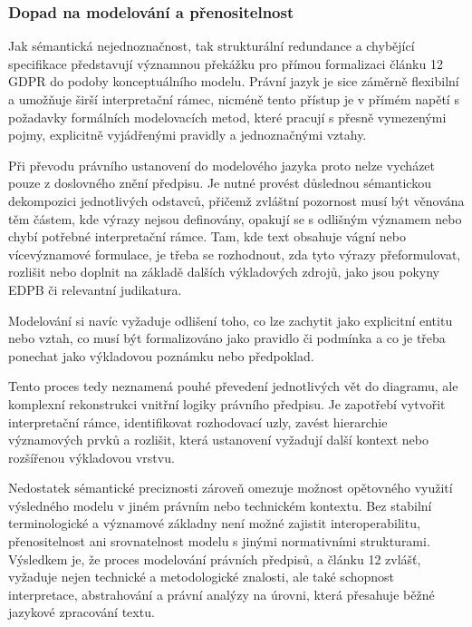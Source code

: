 
\subsubsection{Dopad na modelování a přenositelnost}
\label{sec:dopad-modelovani-prenositelnost}

Jak sémantická nejednoznačnost, tak strukturální redundance a chybějící specifikace představují významnou překážku pro přímou formalizaci článku 12 GDPR do podoby konceptuálního modelu. Právní jazyk je sice záměrně flexibilní a umožňuje širší interpretační rámec, nicméně tento přístup je v přímém napětí s požadavky formálních modelovacích metod, které pracují s přesně vymezenými pojmy, explicitně vyjádřenými pravidly a jednoznačnými vztahy.

Při převodu právního ustanovení do modelového jazyka proto nelze vycházet pouze z doslovného znění předpisu. Je nutné provést důslednou sémantickou dekompozici jednotlivých odstavců, přičemž zvláštní pozornost musí být věnována těm částem, kde výrazy nejsou definovány, opakují se s odlišným významem nebo chybí potřebné interpretační rámce. Tam, kde text obsahuje vágní nebo vícevýznamové formulace, je třeba se rozhodnout, zda tyto výrazy přeformulovat, rozlišit nebo doplnit na základě dalších výkladových zdrojů, jako jsou pokyny EDPB či relevantní judikatura.

Modelování si navíc vyžaduje odlišení toho, co lze zachytit jako explicitní entitu nebo vztah, co musí být formalizováno jako pravidlo či podmínka a co je třeba ponechat jako výkladovou poznámku nebo předpoklad. 

Tento proces tedy neznamená pouhé převedení jednotlivých vět do diagramu, ale komplexní rekonstrukci vnitřní logiky právního předpisu. Je zapotřebí vytvořit interpretační rámce, identifikovat rozhodovací uzly, zavést hierarchie významových prvků a rozlišit, která ustanovení vyžadují další kontext nebo rozšířenou výkladovou vrstvu.

Nedostatek sémantické preciznosti zároveň omezuje možnost opětovného využití výsledného modelu v jiném právním nebo technickém kontextu. Bez stabilní terminologické a významové základny není možné zajistit interoperabilitu, přenositelnost ani srovnatelnost modelu s jinými normativními strukturami. Výsledkem je, že proces modelování právních předpisů, a článku 12 zvlášť, vyžaduje nejen technické a metodologické znalosti, ale také schopnost interpretace, abstrahování a právní analýzy na úrovni, která přesahuje běžné jazykové zpracování textu.

